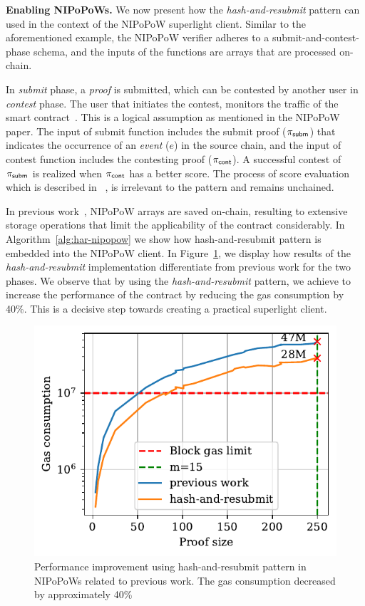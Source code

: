 \noindent \textbf{Enabling NIPoPoWs.} We now present how the
\emph{hash-and-resubmit} pattern can used in the context of the NIPoPoW
superlight client. Similar to the aforementioned example, the NIPoPoW verifier
adheres to a submit-and-contest-phase schema, and the inputs of the functions
are arrays that are processed on-chain.

In \emph{submit} phase, a \emph{proof} is submitted, which can be contested by
another user in \emph{contest} phase. The user that initiates the contest,
monitors the traffic of the smart contract~\cite{nipopows}. This is a logical
assumption as mentioned in the NIPoPoW paper. The input of \textsf{submit}
function includes the submit proof ($\mathsf{\pi_{subm}}$) that indicates the occurrence of an
\emph{event} ($e$) in the source chain, and the input of \textsf{contest}
function includes the contesting proof ($\mathsf{\pi_{cont}}$). A successful contest of $\mathsf{\pi_{subm}}$
is realized when $\mathsf{\pi_{cont}}$ has a better score. The process of score evaluation
which is described in ~\cite{nipopows}, is irrelevant to the pattern and
remains unchained.

In previous work~\cite{gglou}, NIPoPoW arrays are saved on-chain, resulting to
extensive storage operations that limit the applicability of the contract
considerably. In Algorithm~\ref{alg:har-nipopow} we show how hash-and-resubmit
pattern is embedded into the NIPoPoW client. In Figure~\ref{fig:har-nipopow},
we display how results of the \emph{hash-and-resubmit} implementation
differentiate from previous work for the two phases. We observe that by using
the \emph{hash-and-resubmit} pattern, we achieve to increase the performance of
the contract by reducing the gas consumption by 40\%. This is a decisive step
towards creating a practical superlight client.


\begin{figure}[!h]
    \begin{center}
        \includegraphics[width=1\columnwidth]{figures/har-nipopows.pdf}
    \end{center}
    \caption{Performance improvement using hash-and-resubmit pattern in
    NIPoPoWs related to previous work. The gas consumption decreased by
    approximately 40\%}
    \label{fig:har-nipopow}
\end{figure}

